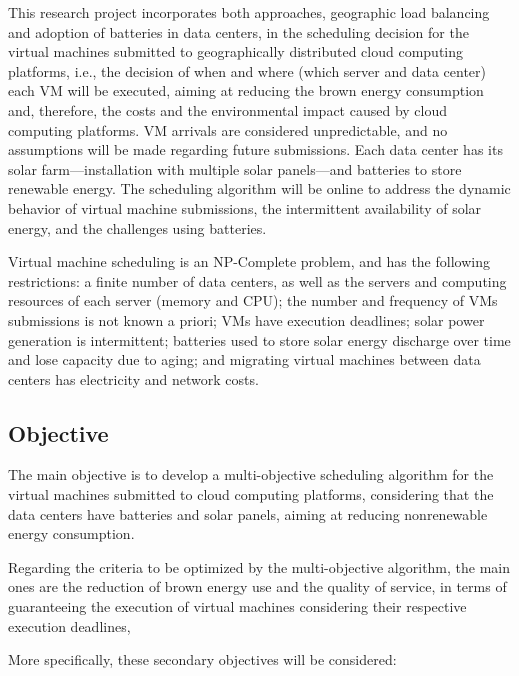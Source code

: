 \documentclass[12pt,a4paper]{article}
\begin{document}
This research project incorporates both approaches, geographic load balancing and adoption of batteries in data centers, in the scheduling decision for the virtual machines submitted to geographically distributed cloud computing platforms, i.e., the decision of when and where (which server and data center) each VM will be executed, aiming at reducing the brown energy consumption and, therefore, the costs and the environmental impact caused by cloud computing platforms. VM arrivals are considered unpredictable, and no assumptions will be made regarding future submissions. Each data center has its solar farm---installation with multiple solar panels---and batteries to store renewable energy. The scheduling algorithm will be online to address the dynamic behavior of virtual machine submissions, the intermittent availability of solar energy, and the challenges using batteries.

Virtual machine scheduling is an NP-Complete problem, and has the following restrictions: a finite number of data centers, as well as the servers and computing resources of each server (memory and CPU); the number and frequency of VMs submissions is not known a priori; VMs have execution deadlines; solar power generation is intermittent; batteries used to store solar energy discharge over time and lose capacity due to aging; and migrating virtual machines between data centers has electricity and network costs.

\subsection{Objective}

The main objective is to develop a multi-objective scheduling algorithm for the virtual machines submitted to cloud computing platforms, considering that the data centers have batteries and solar panels, aiming at reducing nonrenewable energy consumption.

Regarding the criteria to be optimized by the multi-objective algorithm, the main ones are the reduction of brown energy use and the quality of service, in terms of guaranteeing the execution of virtual machines considering their respective execution deadlines,

More specifically, these secondary objectives will be considered:
\end{document}
